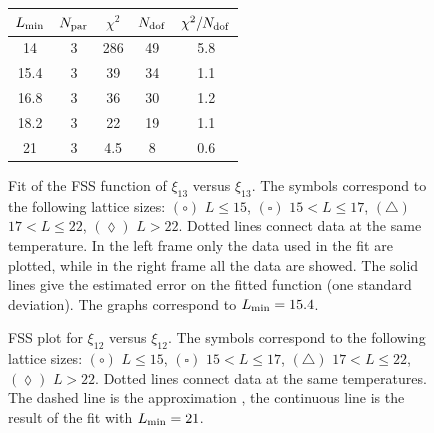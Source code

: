 \documentclass[12pt]{article}
\newcommand{\text}{\rm}
\begin{document}
\begin{figure}
\begin{center}
{\scriptsize
\begin{tabular}{|c|c|c|c|c|}
\hline
$L_{\text{min}}$ & $N_{\text{par}}$ & $\chi^2$ & $N_{\text{dof}}$ &
$\chi^2/N_{\text{dof}}$ \\
\hline
 14    &     3  &      286 &  49 &     5.8\\
 15.4  &     3  &      39 &  34 &     1.1\\
 16.8  &     3  &      36 &  30 &     1.2\\
 18.2  &     3  &      22 &  19 &     1.1\\
 21    &     3  &      4.5 &  8  &     0.6\\
\hline
\end{tabular}
}                                                                               \end{center}
\caption{ Fit of the FSS function of $\xi_{13}$ versus $\xi_{13}$. 
The symbols correspond to the
following lattice sizes: $(\circ)$ $ L\le 15$, $( \square )$ $ 15 < L \le 17$,
$(\triangle)$ $ 17 < L \le 22$, $(\lozenge)$ $ L > 22$. 
Dotted lines connect data at the same temperature. 
In the left frame only the data used in the fit are plotted,
while in the right frame all the data are showed.
The solid lines give the estimated error on
the fitted function (one standard deviation).
The graphs correspond to  $L_{\text{min}}=15.4$.}
\label{fig:fitfss_xi13}
\end{figure}                                                                    

\begin{figure}
\vspace*{-2truecm} 
\begin{center}
\end{center}
\vspace*{-1.5truecm} 
\caption{FSS plot for $\xi_{12}$ versus $\xi_{12}$. 
The symbols correspond to the
following lattice sizes: $(\circ)$ $ L\le 15$, $( \square )$ $ 15 < L \le 17$,
$(\triangle)$ $ 17 < L \le 22$, $(\lozenge)$ $ L > 22$.
Dotted lines connect data at the same temperatures.
The dashed line is the approximation ,
the continuous line is the
result of the fit with $L_{\rm min} = 21$.}
\label{fig:fssplot_xi12}
\end{figure}                                                                    
\end{document}
